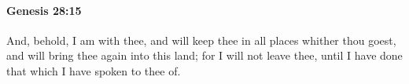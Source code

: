 
		\paragraph{Genesis 28:15} %
			\label{GENESIS-28-15}

			And, behold, I am with thee, and will keep thee in all places whither thou goest, and will bring thee again into this land; for I will not leave thee, until I have done that which I have spoken to thee of.


